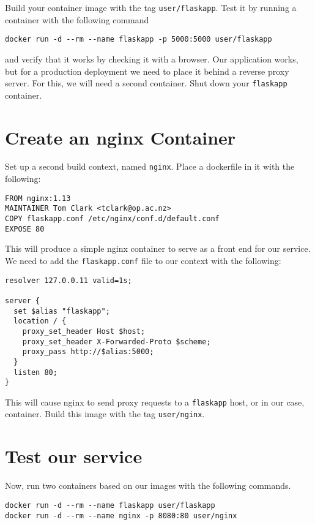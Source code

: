 \documentclass{article}
\begin{document}
Build your container image with the tag \texttt{user/flaskapp}. Test it by running a container with the following command

\begin{verbatim}
docker run -d --rm --name flaskapp -p 5000:5000 user/flaskapp
\end{verbatim}

and verify that it works by checking it with a browser.  Our application works, but for a production deployment we need to place it behind a reverse proxy server. For this, we will need a second container. Shut down your \texttt{flaskapp} container.

\section{Create an nginx Container}
Set up a second build context, named \texttt{nginx}. Place a dockerfile in it with the following:

\begin{verbatim}
FROM nginx:1.13
MAINTAINER Tom Clark <tclark@op.ac.nz>
COPY flaskapp.conf /etc/nginx/conf.d/default.conf
EXPOSE 80
\end{verbatim}

This will produce a simple nginx container to serve as a front end for our service. We need to add the \texttt{flaskapp.conf} file to our context with the following:

\begin{verbatim}
resolver 127.0.0.11 valid=1s;

server {  
  set $alias "flaskapp";
  location / {
    proxy_set_header Host $host;
    proxy_set_header X-Forwarded-Proto $scheme;
    proxy_pass http://$alias:5000;
  }
  listen 80;
}
\end{verbatim}

This will cause nginx to send proxy requests to a \texttt{flaskapp} host, or in our case, container. Build this image with the tag \texttt{user/nginx}.

\section{Test our service}

Now, run two containers based on our images with the following commands.

\begin{verbatim}
docker run -d --rm --name flaskapp user/flaskapp
docker run -d --rm --name nginx -p 8080:80 user/nginx
\end{verbatim}
\end{document}
